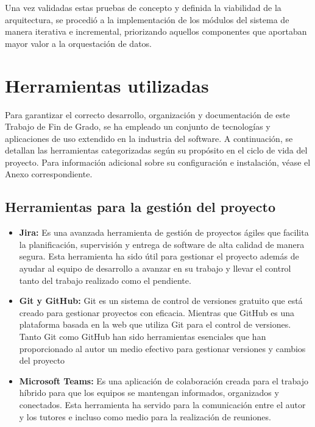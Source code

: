 Una vez validadas estas pruebas de concepto y definida la viabilidad de la arquitectura, se procedió a la implementación de los módulos del sistema de manera iterativa e incremental, priorizando aquellos componentes que aportaban mayor valor a la orquestación de datos. 

\section{Herramientas utilizadas}
Para garantizar el correcto desarrollo, organización y documentación de este Trabajo de Fin de Grado, se ha empleado un conjunto de tecnologías y aplicaciones de uso extendido en la industria del software. A continuación, se detallan las herramientas categorizadas según su propósito en el ciclo de vida del proyecto. Para información adicional sobre su configuración e instalación, véase el Anexo correspondiente.

\subsection{Herramientas para la gestión del proyecto}
\begin{itemize}
    \item \textbf{Jira:} Es una avanzada herramienta de gestión de proyectos ágiles que facilita la planificación, supervisión y entrega de software de alta calidad de manera segura. Esta herramienta ha sido útil para gestionar el proyecto además de ayudar al equipo de desarrollo a avanzar en su trabajo y llevar el control tanto del trabajo realizado como el pendiente.
    \item \textbf{Git y GitHub:} Git es un sistema de control de versiones gratuito que está creado para gestionar proyectos con eficacia. Mientras que GitHub es una plataforma basada en la web que utiliza Git para el control de versiones. Tanto Git como GitHub han sido herramientas esenciales que han proporcionado al autor un medio efectivo para gestionar versiones y cambios del proyecto
    \item \textbf{Microsoft Teams:} Es una aplicación de colaboración creada para el trabajo híbrido para que los equipos se mantengan informados, organizados y conectados. Esta herramienta ha servido para la comunicación entre el autor y los tutores e incluso como medio para la realización de reuniones.
\end{itemize}

